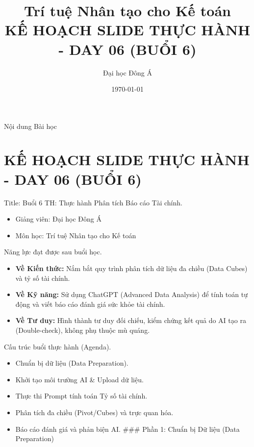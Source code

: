 \documentclass[aspectratio=169]{beamer}
\title[Trí tuệ Nhân tạo cho Kế toán]{Trí tuệ Nhân tạo cho Kế toán \\ \vspace{0.3cm} \Large KẾ HOẠCH SLIDE THỰC HÀNH - DAY 06 (BUỔI 6)}
\author{Đại học Đông Á}
\date{\today}
\begin{document}
\begin{frame}
    \titlepage
\end{frame}

\begin{frame}{Nội dung Bài học}
    \tableofcontents
\end{frame}


\section{KẾ HOẠCH SLIDE THỰC HÀNH - DAY 06 (BUỔI 6)}


\begin{frame}{Title: Buổi 6 TH: Thực hành Phân tích Báo cáo Tài chính.}
    \begin{itemize}
        \item Giảng viên: Đại học Đông Á
        \item Môn học: Trí tuệ Nhân tạo cho Kế toán
    \end{itemize}
\end{frame}


\begin{frame}{Năng lực đạt được sau buổi học.}
    \begin{itemize}
        \item \textbf{Về Kiến thức:} Nắm bắt quy trình phân tích dữ liệu đa chiều (Data Cubes) và tỷ số tài chính.
        \item \textbf{Về Kỹ năng:} Sử dụng ChatGPT (Advanced Data Analysis) để tính toán tự động và viết báo cáo đánh giá sức khỏe tài chính.
        \item \textbf{Về Tư duy:} Hình thành tư duy đối chiếu, kiểm chứng kết quả do AI tạo ra (Double-check), không phụ thuộc mù quáng.
    \end{itemize}
\end{frame}


\begin{frame}{Cấu trúc buổi thực hành (Agenda).}
    \begin{itemize}
        \item Chuẩn bị dữ liệu (Data Preparation).
        \item Khởi tạo môi trường AI \& Upload dữ liệu.
        \item Thực thi Prompt tính toán Tỷ số tài chính.
        \item Phân tích đa chiều (Pivot/Cubes) và trực quan hóa.
        \item Báo cáo đánh giá và phản biện AI.
        ### Phần 1: Chuẩn bị Dữ liệu (Data Preparation)
    \end{itemize}
\end{frame}
\end{document}
